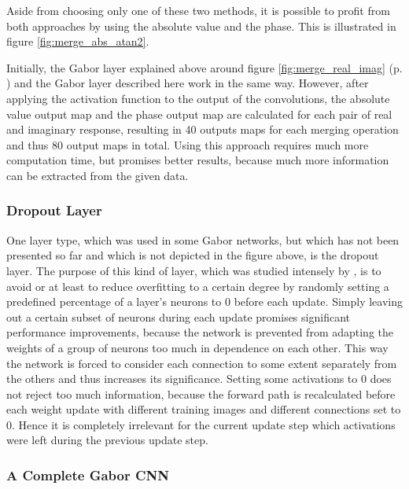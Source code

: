 \documentclass[11pt, a4paper]{article}
\newcommand\myref[1]{\ref{#1} (p. \pageref{#1})}
\begin{document}
Aside from choosing only one of these two methods, it is possible to profit from both approaches by using the absolute value and the phase. This is illustrated in figure \ref{fig:merge_abs_atan2}.

Initially, the Gabor layer explained above around figure \myref{fig:merge_real_imag} and the Gabor layer described here work in the same way. However, after applying the activation function to the output of the convolutions, the absolute value output map and the phase output map are calculated for each pair of real and imaginary response, resulting in 40 outputs maps for each merging operation and thus 80 output maps in total. Using this approach requires much more computation time, but promises better results, because much more information can be extracted from the given data.

\subsubsection{Dropout Layer}

One layer type, which was used in some Gabor networks, but which has not been presented so far and which is not depicted in the figure above, is the dropout layer. The purpose of this kind of layer, which was studied intensely by \cite{dropout}, is to avoid or at least to reduce overfitting to a certain degree by randomly setting a predefined percentage of a layer's neurons to $0$ before each update. Simply leaving out a certain subset of neurons during each update promises significant performance improvements, because the network is prevented from adapting the weights of a group of neurons too much in dependence on each other. This way the network is forced to consider each connection to some extent separately from the others and thus increases its significance. Setting some activations to $0$ does not reject too much information, because the forward path is recalculated before each weight update with different training images and different connections set to 0. Hence it is completely irrelevant for the current update step which activations were left during the previous update step.

\subsubsection{A Complete Gabor CNN}
\end{document}
